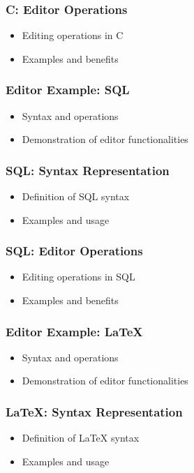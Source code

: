 \documentclass[t,24pt,aspectratio=169]{beamer}
\begin{document}
\begin{frame}[hvid]
    \frametitle{C: Editor Operations}
    \begin{itemize}
        \item Editing operations in C
        \item Examples and benefits
    \end{itemize}
\end{frame}

\begin{frame}[hvid]
    \frametitle{Editor Example: SQL}
    \begin{itemize}
        \item Syntax and operations
        \item Demonstration of editor functionalities
    \end{itemize}
\end{frame}

\begin{frame}[hvid]
    \frametitle{SQL: Syntax Representation}
    \begin{itemize}
        \item Definition of SQL syntax
        \item Examples and usage
    \end{itemize}
\end{frame}

\begin{frame}[hvid]
    \frametitle{SQL: Editor Operations}
    \begin{itemize}
        \item Editing operations in SQL
        \item Examples and benefits
    \end{itemize}
\end{frame}

\begin{frame}[hvid]
    \frametitle{Editor Example: LaTeX}
    \begin{itemize}
        \item Syntax and operations
        \item Demonstration of editor functionalities
    \end{itemize}
\end{frame}

\begin{frame}[hvid]
    \frametitle{LaTeX: Syntax Representation}
    \begin{itemize}
        \item Definition of LaTeX syntax
        \item Examples and usage
    \end{itemize}
\end{frame}
\end{document}
